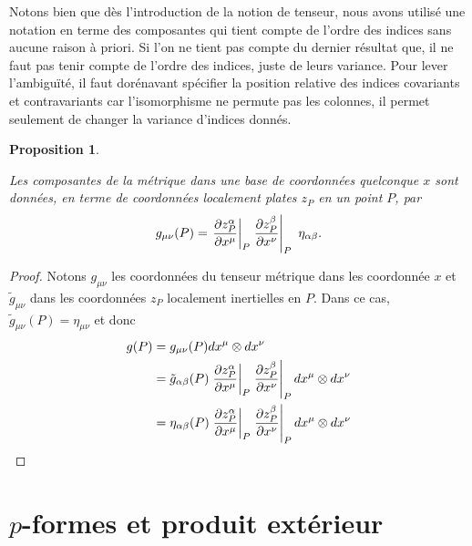 \documentclass[a4paper,11pt]{report}
\theoremstyle{definition}
\theoremstyle{plain}
\newtheorem{prop}[thm]{Proposition}
\theoremstyle{definition}
\theoremstyle{remark}
\begin{document}
                Notons bien que dès l'introduction de la notion de tenseur, nous avons utilisé une notation en terme des composantes qui tient compte de l'ordre des indices sans aucune raison à priori. Si l'on ne tient pas compte du dernier résultat que, il ne faut pas tenir compte de l'ordre des indices, juste de leurs variance. Pour lever l'ambiguïté, il faut dorénavant spécifier la position relative des indices covariants et contravariants car l'isomorphisme ne permute pas les colonnes, il permet seulement de changer la variance d'indices donnés.
                
                \begin{prop}
                \begin{leftbar}
                    Les composantes de la métrique dans une base de coordonnées quelconque $x$ sont données, en terme de coordonnées localement plates $z_P$ en un point $P$, par 
                    \begin{equation}
                        g_{\mu\nu}(P) = \eval{\pdv{z^\alpha_P}{x^\mu}}_{P}\eval{\pdv{z^\beta_P}{x^\nu}}_{P}~\eta_{\alpha\beta}.
                    \end{equation}
                \end{leftbar}
                \end{prop}
                
                \begin{proof}
                    Notons $g_{\mu\nu}$ les coordonnées du tenseur métrique dans les coordonnée $x$ et $\tilde{g}_{\mu\nu}$ dans les coordonnées $z_P$ localement inertielles en $P$. Dans ce cas, $\tilde{g}_{\mu\nu}(P) = \eta_{\mu\nu}$ et donc
                    \begin{align}
                        g(P) &= g_{\mu\nu}(P)dx^\mu\otimes dx^\nu \\
                        &= \tilde{g}_{\alpha\beta}(P) \eval{\pdv{z^\alpha_P}{x^\mu}}_{P}\eval{\pdv{z^\beta_P}{x^\nu}}_{P} dx^\mu\otimes dx^\nu\\
                        &= \eta_{\alpha\beta}(P) \eval{\pdv{z^\alpha_P}{x^\mu}}_{P}\eval{\pdv{z^\beta_P}{x^\nu}}_{P} dx^\mu\otimes dx^\nu
                    \end{align}
                \end{proof}
        
        \section{$p$-formes et produit extérieur}
        
\end{document}
